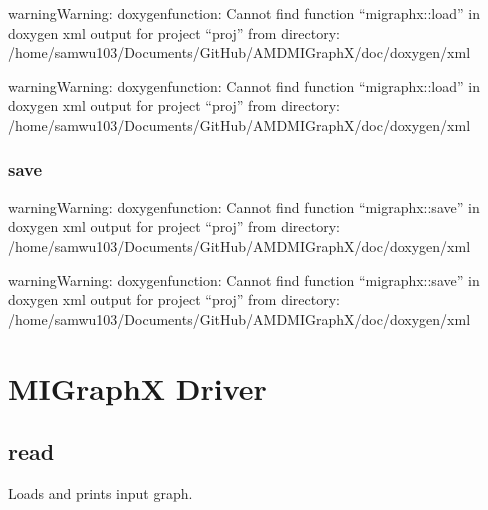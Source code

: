 \documentclass[letterpaper,10pt,english]{sphinxmanual}
\begin{document}
\begin{sphinxadmonition}{warning}{Warning:}
\sphinxAtStartPar
doxygenfunction: Cannot find function “migraphx::load” in doxygen xml output for project “proj” from directory: /home/samwu103/Documents/GitHub/AMDMIGraphX/doc/doxygen/xml
\end{sphinxadmonition}

\begin{sphinxadmonition}{warning}{Warning:}
\sphinxAtStartPar
doxygenfunction: Cannot find function “migraphx::load” in doxygen xml output for project “proj” from directory: /home/samwu103/Documents/GitHub/AMDMIGraphX/doc/doxygen/xml
\end{sphinxadmonition}


\subsection{save}
\label{\detokenize{reference/cpp:save}}
\begin{sphinxadmonition}{warning}{Warning:}
\sphinxAtStartPar
doxygenfunction: Cannot find function “migraphx::save” in doxygen xml output for project “proj” from directory: /home/samwu103/Documents/GitHub/AMDMIGraphX/doc/doxygen/xml
\end{sphinxadmonition}

\begin{sphinxadmonition}{warning}{Warning:}
\sphinxAtStartPar
doxygenfunction: Cannot find function “migraphx::save” in doxygen xml output for project “proj” from directory: /home/samwu103/Documents/GitHub/AMDMIGraphX/doc/doxygen/xml
\end{sphinxadmonition}


\chapter{MIGraphX Driver}
\label{\detokenize{driver:migraphx-driver}}\label{\detokenize{driver::doc}}

\section{read}
\label{\detokenize{driver:read}}
\sphinxAtStartPar
Loads and prints input graph.
\end{document}

